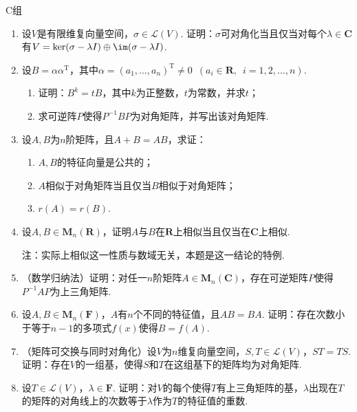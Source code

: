 \centerline{\heiti C组}
\begin{enumerate}
    \item 设$V$是有限维复向量空间，$\sigma\in \mathcal{L}(V)$. 证明：$\sigma$可对角化当且仅当对每个$\lambda\in\mathbf{C}$有$V=\ker(\sigma-\lambda I)\oplus\im(\sigma-\lambda I)$.
    \item 设$B=\alpha\alpha^\mathrm{T}$，其中$\alpha=(a_1,\ldots,a_n)^\mathrm{T}\neq 0\enspace(a_i\in\mathbf{R},\enspace i=1,2,\ldots,n)$.
          \begin{enumerate}
              \item 证明：$B^k=tB$，其中$k$为正整数，$t$为常数，并求$t$；

              \item 求可逆阵$P$使得$P^{-1}BP$为对角矩阵，并写出该对角矩阵.
          \end{enumerate}

    \item 设$A,B$为$n$阶矩阵，且$A+B=AB$，求证：
          \begin{enumerate}
              \item $A,B$的特征向量是公共的；

              \item $A$相似于对角矩阵当且仅当$B$相似于对角矩阵；

              \item $r(A)=r(B)$.
          \end{enumerate}

    \item 设$A,B\in \mathbf{M}_n(\mathbf{R})$，证明$A$与$B$在$\mathbf{R}$上相似当且仅当在$\mathbf{C}$上相似.

          {\kaishu 注：实际上相似这一性质与数域无关，本题是这一结论的特例.}

    \item （数学归纳法）证明：对任一$n$阶矩阵$A\in \mathbf{M}_n(\mathbf{C})$，存在可逆矩阵$P$使得$P^{-1}AP$为上三角矩阵.

    \item 设$A,B\in \mathbf{M}_n(\mathbf{F})$，$A$有$n$个不同的特征值，且$AB=BA$. 证明：存在次数小于等于$n-1$的多项式$f(x)$使得$B=f(A)$.

    \item （矩阵可交换与同时对角化）设$V$为$n$维复向量空间，$S,T\in \mathcal{L}(V)$，$ST=TS$. 证明：存在$V$的一组基，使得$S$和$T$在这组基下的矩阵均为对角矩阵.

    \item 设$T\in \mathcal{L}(V)$，$\lambda\in\mathbf{F}$. 证明：对$V$的每个使得$T$有上三角矩阵的基，$\lambda$出现在$T$的矩阵的对角线上的次数等于$\lambda$作为$T$的特征值的重数.
\end{enumerate}

